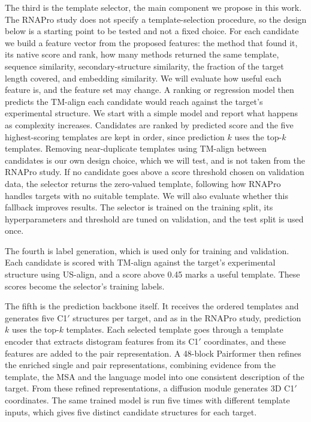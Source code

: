 \documentclass{FastFyp}
\begin{document}
The third is the template selector, the main component we propose in this work. The RNAPro study does not specify a template-selection procedure, so the design below is a starting point to be tested and not a fixed choice. For each candidate we build a feature vector from the proposed features: the method that found it, its native score and rank, how many methods returned the same template, sequence similarity, secondary-structure similarity, the fraction of the target length covered, and embedding similarity. We will evaluate how useful each feature is, and the feature set may change. A ranking or regression model then predicts the TM-align each candidate would reach against the target's experimental structure. We start with a simple model and report what happens as complexity increases. Candidates are ranked by predicted score and the five highest-scoring templates are kept in order, since prediction $k$ uses the top-$k$ templates. Removing near-duplicate templates using TM-align between candidates is our own design choice, which we will test, and is not taken from the RNAPro study. If no candidate goes above a score threshold chosen on validation data, the selector returns the zero-valued template, following how RNAPro handles targets with no suitable template. We will also evaluate whether this fallback improves results. The selector is trained on the training split, its hyperparameters and threshold are tuned on validation, and the test split is used once.

The fourth is label generation, which is used only for training and validation. Each candidate is scored with TM-align against the target's experimental structure using US-align, and a score above 0.45 marks a useful template. These scores become the selector's training labels.

The fifth is the prediction backbone itself. It receives the ordered templates and generates five C1$'$ structures per target, and as in the RNAPro study, prediction $k$ uses the top-$k$ templates. Each selected template goes through a template encoder that extracts distogram features from its C1$'$ coordinates, and these features are added to the pair representation. A 48-block Pairformer then refines the enriched single and pair representations, combining evidence from the template, the MSA and the language model into one consistent description of the target. From these refined representations, a diffusion module generates 3D C1$'$ coordinates. The same trained model is run five times with different template inputs, which gives five distinct candidate structures for each target.
\end{document}
